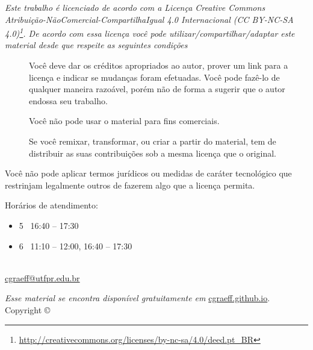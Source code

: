 \thispagestyle{empty}
\begin{center}
\Huge\ccbyncsa
\end{center}
{\it
Este trabalho é licenciado de acordo com a Licença Creative Commons  Atribuição-NãoComercial-CompartilhaIgual 4.0 Internacional  (CC BY-NC-SA 4.0)\footnote{\url{http://creativecommons.org/licenses/by-nc-sa/4.0/deed.pt_BR}}. De acordo com essa licença você pode utilizar/compartilhar/adaptar este material desde que respeite as seguintes condições
\begin{description}
	\item[\ccAttribution]Você deve dar os créditos apropriados ao autor, prover um link para a licença e indicar se mudanças foram efetuadas. Você pode fazê-lo de qualquer maneira razoável, porém não de forma a sugerir que o autor endossa seu trabalho.

    \item[\ccNonCommercial]Você não pode usar o material para fins comerciais.

    \item[\ccShareAlike]Se você remixar, transformar, ou criar a partir do material, tem de distribuir as suas contribuições sob a mesma licença que o original.
\end{description}
Você não pode aplicar termos jurídicos ou medidas de caráter tecnológico que restrinjam legalmente outros de fazerem algo que a licença permita.
}

%
\vfill
%
\begin{fullwidth}
Horários de atendimento:
\begin{itemize}
	\item 5\textordfeminine~ 16:40 -- 17:30
	\item 6\textordfeminine~ 11:10 -- 12:00, 16:40 -- 17:30
\end{itemize}
\end{fullwidth}
%
\begin{fullwidth}
\setlength{\parindent}{0pt}
\setlength{\parskip}{\baselineskip}
\thanklessauthor\\
\url{cgraeff@utfpr.edu.br}\\
\textit{\monthyear}
\end{fullwidth}
%
\vspace{1cm}
%
\begin{fullwidth}
\par\emph{Esse material se encontra disponível gratuitamente em} \url{cgraeff.github.io}.\\
\noindent{}Copyright \copyright\ \the\year\ \thanklessauthor
\end{fullwidth}

